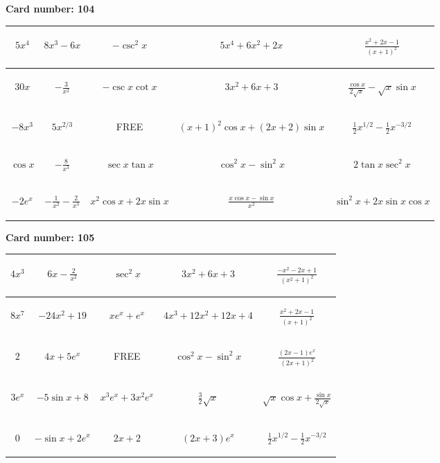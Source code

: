 \documentclass{article}
\newcommand{\entry}[1]{\begin{minipage}[t][2.75cm][t]{4cm} \vspace{1cm} \begin{center}#1\end{center} \end{minipage}}
\newcommand{\freespace}{\entry{FREE}}
\newcommand{\cardnumber}[1]{\noindent \textbf{Card number: #1} \bigskip}
\begin{document}
\pagebreak

\cardnumber{104}
\begin{center}
\begin{tabular}{|*{5}{c|}}
    \hline
    \entry{$5x^4$} & \entry{$8x^3 - 6x$} & \entry{$-\csc^2 x$} & \entry{$5x^4 + 6x^2 + 2x$} & \entry{$\frac{x^2 + 2x - 1}{(x + 1)^2}$} \\ \hline
    \entry{$30x$} & \entry{$-\frac{3}{x^2}$} & \entry{$-\csc x \cot x$} & \entry{$3x^2 + 6x + 3$} & \entry{$\frac{\cos x}{2 \sqrt{x}} - \sqrt{x} \sin x$} \\ \hline
    \entry{$-8x^3$} & \entry{$5x^{2/3}$} & \freespace & \entry{$(x + 1)^2 \cos x + (2x + 2) \sin x$} & \entry{$\frac{1}{2} x^{1/2} - \frac{1}{2} x^{-3/2}$} \\ \hline
    \entry{$\cos x$} & \entry{$-\frac{8}{x^3}$} & \entry{$\sec x \tan x$} & \entry{$\cos^2 x - \sin^2 x$} & \entry{$2 \tan x \sec^2 x$} \\ \hline
    \entry{$-2e^x$} & \entry{$-\frac{1}{x^2} - \frac{2}{x^3}$} & \entry{$x^2 \cos x + 2x \sin x$} & \entry{$\frac{x \cos x - \sin x}{x^2}$} & \entry{$\sin^2 x + 2x \sin x \cos x$} \\ \hline
\end{tabular}
\end{center}

\pagebreak

\cardnumber{105}
\begin{center}
\begin{tabular}{|*{5}{c|}}
    \hline
    \entry{$4x^3$} & \entry{$6x - \frac{2}{x^2}$} & \entry{$\sec^2 x$} & \entry{$3x^2 + 6x + 3$} & \entry{$\frac{-x^2 - 2x + 1}{(x^2 + 1)^2}$} \\ \hline
    \entry{$8x^7$} & \entry{$-24x^2 + 19$} & \entry{$x e^x + e^x$} & \entry{$4x^3 + 12x^2 + 12x + 4$} & \entry{$\frac{x^2 + 2x - 1}{(x + 1)^2}$} \\ \hline
    \entry{$2$} & \entry{$4x + 5e^x$} & \freespace & \entry{$\cos^2 x - \sin^2 x$} & \entry{$\frac{(2x - 1) e^x}{(2x + 1)^2}$} \\ \hline
    \entry{$3e^x$} & \entry{$-5 \sin x + 8$} & \entry{$x^3 e^x + 3x^2 e^x$} & \entry{$\frac{3}{2} \sqrt{x}$} & \entry{$\sqrt{x} \cos x + \frac{\sin x}{2 \sqrt{x}}$} \\ \hline
    \entry{$0$} & \entry{$-\sin x + 2e^x$} & \entry{$2x + 2$} & \entry{$(2x + 3) e^x$} & \entry{$\frac{1}{2} x^{1/2} - \frac{1}{2} x^{-3/2}$} \\ \hline
\end{tabular}
\end{center}
\end{document}
